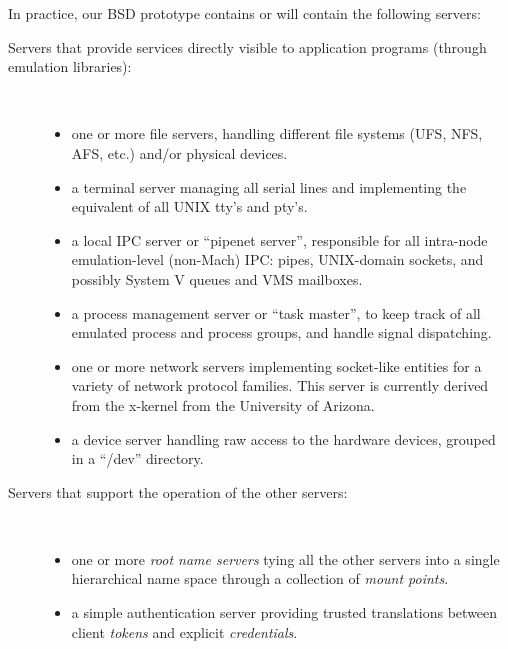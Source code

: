 In practice, our BSD prototype contains or will contain the following
servers:
\begin{description}

\item[Servers that provide services directly visible to application
programs (through emulation libraries):] ~\

\begin{itemize}

\item one or more file servers, handling different file systems (UFS,
NFS, AFS, etc.) and/or physical devices.

\item a terminal server managing all serial lines and implementing the
equivalent of all UNIX tty's and pty's.

\item a local IPC server or ``pipenet server'', responsible for all
intra-node emulation-level (non-Mach) IPC: pipes, UNIX-domain sockets,
and possibly System V queues and VMS mailboxes.

\item a process management server or ``task master'', to keep track of
all emulated process and process groups, and handle signal
dispatching.

\item one or more network servers implementing socket-like entities
for a variety of network protocol families. This server is currently
derived from the x-kernel from the University of
Arizona\cite{PETERSON90}.

\item a device server handling raw access to the hardware devices,
grouped in a ``/dev'' directory.

\end{itemize}

\item[Servers that support the operation of the other servers:] ~\ 

\begin{itemize}

\item one or more {\em root name servers} tying all the other servers
into a single hierarchical name space through a collection of {\em
mount points}.

\item a simple authentication server providing trusted
translations between client {\em tokens} and explicit {\em
credentials}.


\end{itemize}
\end{description}
